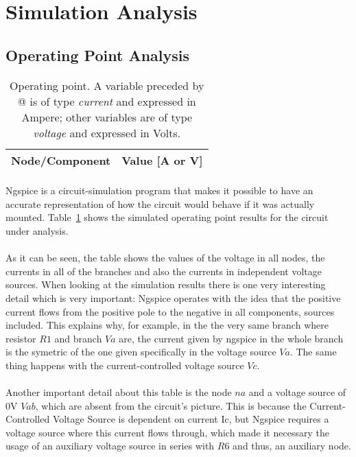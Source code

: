 \section{Simulation Analysis}
\label{sec:simulation}

\subsection{Operating Point Analysis}
\begin{table}[h] \centering
  \begin{tabular}{|l|r|}
    \hline    
    {\bf Node/Component} & {\bf Value [A or V]} \\ \hline
    
  \end{tabular}
  \caption{Operating point. A variable preceded by @ is of type {\em current}
    and expressed in Ampere; other variables are of type {\it voltage} and expressed in
    Volts.}
  \label{tab:op}
\end{table}



\paragraph{}Ngspice is a circuit-simulation program that makes it possible to have an accurate representation of how the circuit would behave if it was actually mounted. Table~\ref{tab:op} shows the simulated operating point results for the circuit
under analysis.


\paragraph{}As it can be seen, the table shows the values of the voltage in all nodes, the currents in all of the branches and also the currents in independent voltage sources. When looking at the simulation results there is one very interesting detail which is very important: Ngspice operates with the idea that the positive current flows from the positive pole to the negative in all components, sources included. This explains why, for example, in the the very same branch where resistor $R1$ and branch $Va$ are, the current given by ngspice in the whole branch is the symetric of the one given specifically in the voltage source $Va$. The same thing happens with the current-controlled voltage source $Vc$.
\paragraph{} Another important detail about this table is the node $na$ and a voltage source of 0V $Vab$, which are absent from the circuit's picture. This is because the Current-Controlled Voltage Source is dependent on current Ic, but Ngspice requires a voltage source where this current flows through, which made it necessary the usage of an auxiliary voltage source in series with $R6$ and thus, an auxiliary node.  



